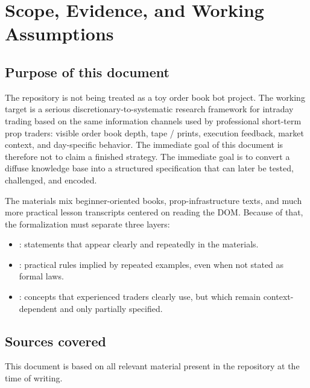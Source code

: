 \section{Scope, Evidence, and Working Assumptions}

\subsection{Purpose of this document}

The repository is not being treated as a toy order book bot project. The working target is a
serious discretionary-to-systematic research framework for intraday trading based on the same
information channels used by professional short-term prop traders: visible order book depth,
tape / prints, execution feedback, market context, and day-specific behavior. The immediate
goal of this document is therefore not to claim a finished strategy. The immediate goal is to
convert a diffuse knowledge base into a structured specification that can later be tested,
challenged, and encoded.

The materials mix beginner-oriented books, prop-infrastructure texts, and much more
practical lesson transcripts centered on reading the DOM. Because of that, the formalization
must separate three layers:

\begin{itemize}[leftmargin=1.4em]
  \item {}: statements that appear clearly and repeatedly in the materials.
  \item {}: practical rules implied by repeated examples, even when not
        stated as formal laws.
  \item {}: concepts that experienced traders clearly use, but which
        remain context-dependent and only partially specified.
\end{itemize}

\subsection{Sources covered}

This document is based on all relevant material present in the repository at the time of
writing.


